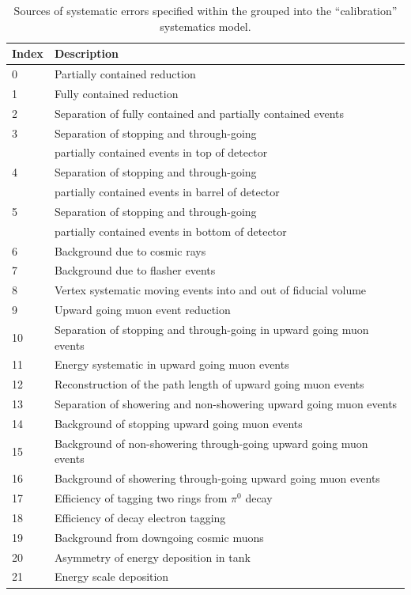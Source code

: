 \begin{table}[ht!]
  \centering
  \caption{Sources of systematic errors specified within the grouped into the ``calibration'' systematics model.}
  \label{SelsAndSysts_Systs_ATMPDCalibSysts}
		
  \begin{tabular}{ll} 
    
    \hline Index & Description \\ 
    \hline
    0 & Partially contained reduction  \\
    1 & Fully contained reduction \\
    2 & Separation of fully contained and partially contained events \\
    3 & Separation of stopping and through-going\\
      & \hspace{0.4cm} partially contained events in top of detector \\
    4 & Separation of stopping and through-going\\
      & \hspace{0.4cm} partially contained events in barrel of detector \\
    5 & Separation of stopping and through-going\\
      & \hspace{0.4cm} partially contained events in bottom of detector \\
    6 & Background due to cosmic rays \\
    7 & Background due to flasher events \\
    8 & Vertex systematic moving events into and out of fiducial volume \\
    9 & Upward going muon event reduction \\
    10 & Separation of stopping and through-going in upward going muon events \\
    11 & Energy systematic in upward going muon events \\
    12 & Reconstruction of the path length of upward going muon events \\
    13 & Separation of showering and non-showering upward going muon events \\
    14 & Background of stopping upward going muon events \\
    15 & Background of non-showering through-going upward going muon events \\
    16 & Background of showering through-going upward going muon events \\
    17 & Efficiency of tagging two rings from $\pi^0$ decay \\
    18 & Efficiency of decay electron tagging \\
    19 & Background from downgoing cosmic muons \\
    20 & Asymmetry of energy deposition in tank \\
    21 & Energy scale deposition \\
    \hline
  \end{tabular}
\end{table}

